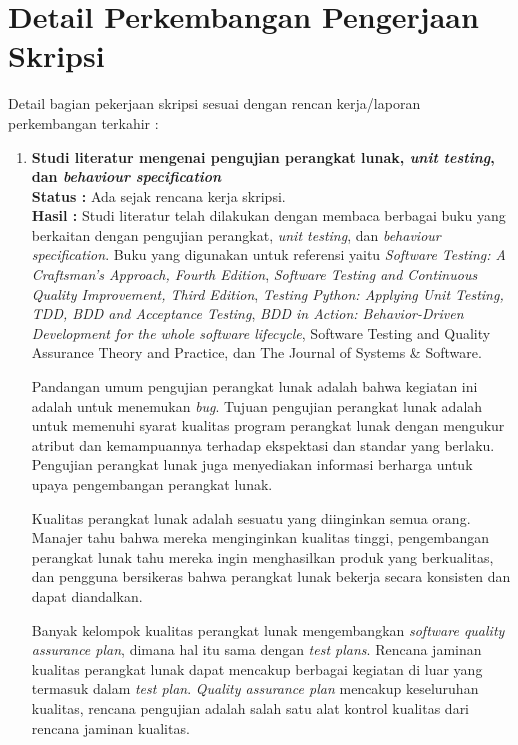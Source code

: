 \documentclass[a4paper,twoside]{article}
\begin{document}
\section{Detail Perkembangan Pengerjaan Skripsi}
Detail bagian pekerjaan skripsi sesuai dengan rencan kerja/laporan perkembangan terkahir :
	\begin{enumerate}
		\item \textbf{Studi literatur mengenai pengujian perangkat lunak, \textit{unit testing}, dan \textit{behaviour specification}}\\
		{\bf Status :} Ada sejak rencana kerja skripsi.\\
		{\bf Hasil :} Studi literatur telah dilakukan dengan membaca berbagai buku yang berkaitan dengan pengujian perangkat, \textit{unit testing}, dan \textit{behaviour specification}. Buku yang digunakan untuk referensi yaitu \textit{Software Testing: A Craftsman’s Approach, Fourth Edition}, \textit{Software Testing and Continuous Quality Improvement, Third Edition}, \textit{Testing Python: Applying Unit Testing, TDD, BDD and Acceptance Testing}, \textit{BDD in Action: Behavior-Driven Development for the whole software lifecycle}, Software Testing and Quality Assurance Theory and Practice, dan The Journal of Systems \& Software.
		
Pandangan umum pengujian perangkat lunak adalah bahwa kegiatan ini adalah untuk menemukan \textit{bug}. Tujuan pengujian perangkat lunak adalah untuk memenuhi syarat kualitas program perangkat lunak dengan mengukur atribut dan kemampuannya terhadap ekspektasi dan standar yang berlaku. Pengujian perangkat lunak juga menyediakan informasi berharga untuk upaya pengembangan perangkat lunak.

Kualitas perangkat lunak adalah sesuatu yang diinginkan semua orang. Manajer tahu bahwa mereka menginginkan kualitas tinggi, pengembangan perangkat lunak tahu mereka ingin menghasilkan produk yang berkualitas, dan pengguna bersikeras bahwa perangkat lunak bekerja secara konsisten dan dapat diandalkan.

Banyak kelompok kualitas perangkat lunak mengembangkan \textit{software quality assurance plan}, dimana hal itu sama dengan \textit{test plans}. Rencana jaminan kualitas perangkat lunak dapat mencakup berbagai kegiatan di luar yang termasuk dalam \textit{test plan}. \textit{Quality assurance plan} mencakup keseluruhan kualitas, rencana pengujian adalah salah satu alat kontrol kualitas dari rencana jaminan kualitas.


\end{enumerate}
\end{document}

